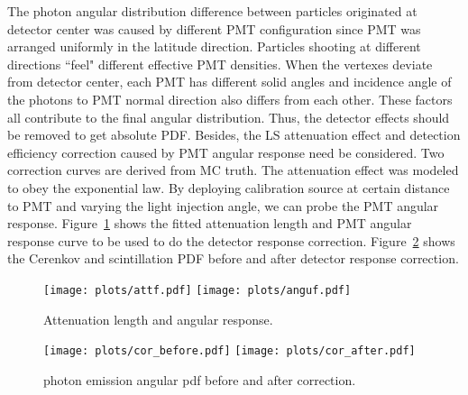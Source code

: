 \documentclass[a4paper,10pt]{cpc-hepnp}
\begin{document}
The photon angular distribution difference between particles
originated at detector center was caused by different PMT configuration since
PMT was arranged uniformly in the latitude direction. Particles shooting at 
different directions ``feel" different effective PMT densities.
When the vertexes deviate from detector center, each PMT has different solid angles
and incidence angle of the photons to PMT normal direction also differs from 
each other. These factors all contribute to the final angular distribution.
Thus, the detector effects should be removed to get absolute PDF.
Besides, the LS attenuation effect and detection efficiency correction caused by PMT
angular response need be considered. Two correction curves are derived from MC truth.
The attenuation effect was modeled to obey the exponential law. By deploying 
calibration source at certain distance to
PMT and varying the light injection angle, we can probe the PMT angular
response. Figure~\ref{att_angu} shows the fitted attenuation length and PMT
angular response curve to be used to do the detector response correction.
Figure~\ref{xzcomp} shows the Cerenkov and scintillation PDF before and after
detector response correction.
\begin{figure}[htbp]
\centering %
\texttt{[image: plots/attf.pdf]}
\hfill
\texttt{[image: plots/anguf.pdf]}
\caption{\label{att_angu} Attenuation length and angular response.}
\end{figure}
\begin{figure}[htbp]
\centering %
\texttt{[image: plots/cor\_before.pdf]}%
\hfill
\texttt{[image: plots/cor\_after.pdf]}%
\caption{\label{xzcomp} photon emission angular pdf before and after
correction.}
\end{figure}
\end{document}
